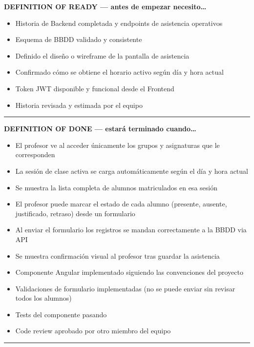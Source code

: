 \documentclass[
  spanish,
  11pt,
]{report}
\providecommand{\tightlist}{%
  \setlength{\itemsep}{0pt}\setlength{\parskip}{0pt}}
\begin{document}
\textbf{DEFINITION OF READY --- antes de empezar necesito\ldots{}}

\begin{itemize}
\tightlist
\item
  Historia de Backend completada y endpoints de asistencia operativos
\item
  Esquema de BBDD validado y consistente
\item
  Definido el diseño o wireframe de la pantalla de asistencia
\item
  Confirmado cómo se obtiene el horario activo según día y hora actual
\item
  Token JWT disponible y funcional desde el Frontend
\item
  Historia revisada y estimada por el equipo
\end{itemize}

\begin{center}\rule{0.5\linewidth}{0.5pt}\end{center}

\textbf{DEFINITION OF DONE --- estará terminado cuando\ldots{}}

\begin{itemize}
\tightlist
\item
  El profesor ve al acceder únicamente los grupos y asignaturas que le
  corresponden
\item
  La sesión de clase activa se carga automáticamente según el día y hora
  actual
\item
  Se muestra la lista completa de alumnos matriculados en esa sesión
\item
  El profesor puede marcar el estado de cada alumno (presente, ausente,
  justificado, retraso) desde un formulario
\item
  Al enviar el formulario los registros se mandan correctamente a la
  BBDD via API
\item
  Se muestra confirmación visual al profesor tras guardar la asistencia
\item
  Componente Angular implementado siguiendo las convenciones del
  proyecto
\item
  Validaciones de formulario implementadas (no se puede enviar sin
  revisar todos los alumnos)
\item
  Tests del componente pasando
\item
  Code review aprobado por otro miembro del equipo
\end{itemize}

\begin{center}\rule{0.5\linewidth}{0.5pt}\end{center}
\end{document}

